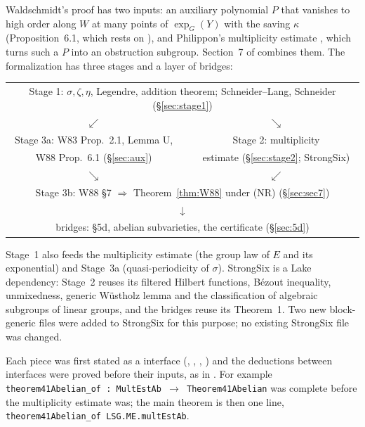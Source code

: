 \documentclass[11pt]{amsart}
\theoremstyle{definition}
\theoremstyle{remark}
\numberwithin{equation}{section}
\newcommand{\NR}{\textup{(NR)}}
\begin{document}
Waldschmidt's proof \cite[\S\S6--7]{W88} has two inputs: an auxiliary polynomial $P$ that vanishes to
high order along $W$ at many points of $\exp_G(Y)$ with the saving $\kappa$ (Proposition~6.1, which
rests on \cite[Prop.~2.1, 2.4]{W83}), and Philippon's multiplicity estimate \cite{Philippon1986},
which turns such a $P$ into an obstruction subgroup. Section~7 of \cite{W88} combines them. The
formalization has three stages and a layer of bridges:
\begin{center}\small
\begin{tabular}{ccc}
\multicolumn{3}{c}{Stage 1: $\sigma,\zeta,\eta$, Legendre, addition theorem;
Schneider--Lang, Schneider (\S\ref{sec:stage1})}\\[2pt]
$\swarrow$ & & $\searrow$\\[2pt]
Stage 3a: W83 Prop.~2.1, Lemma U, & & Stage 2: multiplicity\\
W88 Prop.~6.1 (\S\ref{sec:aux}) & & estimate (\S\ref{sec:stage2}; StrongSix)\\[2pt]
$\searrow$ & & $\swarrow$\\[2pt]
\multicolumn{3}{c}{Stage 3b: W88 \S7 $\Rightarrow$ Theorem~\ref{thm:W88} under \NR{} (\S\ref{sec:sec7})}\\[2pt]
\multicolumn{3}{c}{$\downarrow$}\\[2pt]
\multicolumn{3}{c}{bridges: \S5d, abelian subvarieties, the certificate (\S\ref{sec:5d})}
\end{tabular}
\end{center}
Stage~1 also feeds the multiplicity estimate (the group law of $E$ and its exponential) and Stage~3a
(quasi-periodicity of $\sigma$). StrongSix \cite{StrongSixRepo} is a Lake dependency: Stage~2 reuses
its filtered Hilbert functions, Bézout inequality, unmixedness, generic Wüstholz lemma and the
classification of algebraic subgroups of linear groups, and the bridges reuse its Theorem~1. Two
new block-generic files were added to StrongSix for this purpose; no existing StrongSix file was
changed.

Each piece was first stated as a  interface (,
, , ) and the deductions between
interfaces were proved before their inputs, as in \cite{StrongSixPaper}. For example
\texttt{theorem41Abelian\_of\ :\ MultEstAb\ }$\to$\texttt{\ Theorem41Abelian} was complete before the multiplicity
estimate was; the main theorem is then one line, \texttt{theorem41Abelian\_of\ LSG.ME.multEstAb}.
\end{document}
